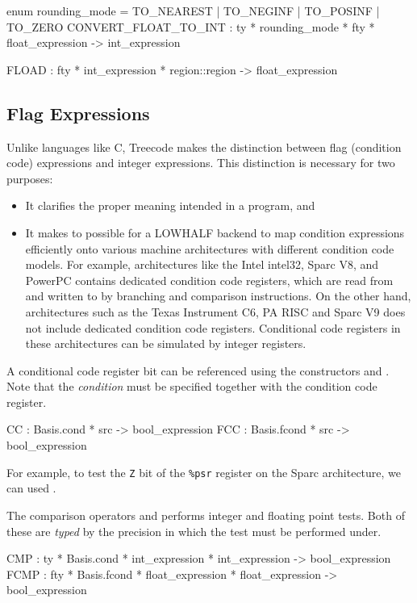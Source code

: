 \begin{SML}
  enum rounding_mode = TO_NEAREST | TO_NEGINF | TO_POSINF | TO_ZERO
  CONVERT_FLOAT_TO_INT : ty * rounding_mode * fty * float_expression -> int_expression
\end{SML}

\begin{SML}
   FLOAD : fty * int_expression * region::region -> float_expression
\end{SML}

\subsection{Flag Expressions}
Unlike languages like C, Treecode makes the distinction between flag
(condition code) expressions and integer expressions.  This distinction is necessary for
two purposes:
\begin{itemize}
  \item It clarifies the proper meaning intended in a program, and
  \item It makes to possible for a LOWHALF backend to map condition
expressions efficiently onto various machine architectures with different
condition code models.  For example, architectures like the Intel intel32, 
Sparc V8, and PowerPC contains dedicated condition code registers, which
are read from and written to by branching and comparison instructions.
On the other hand, architectures such as the Texas Instrument C6, PA RISC
and Sparc V9 does not include dedicated condition code registers.
Conditional code registers in these architectures
can be simulated by integer registers.
\end{itemize}


A conditional code register bit can be referenced using the constructors
 and .  Note that the \emph{condition} must be specified
together with the condition code register.
\begin{SML}
   CC   : Basis.cond * src -> bool_expression 
   FCC  : Basis.fcond * src -> bool_expression    
\end{SML}
For example, to test the \verb|Z| bit of the \verb|%psr| register on the
Sparc architecture, we can used .  

The comparison operators  and  performs integer and
floating point tests.  Both of these are \emph{typed} by the precision
in which the test must be performed under.
\begin{SML}
   CMP  : ty * Basis.cond * int_expression * int_expression -> bool_expression  
   FCMP : fty * Basis.fcond * float_expression * float_expression -> bool_expression
\end{SML}

